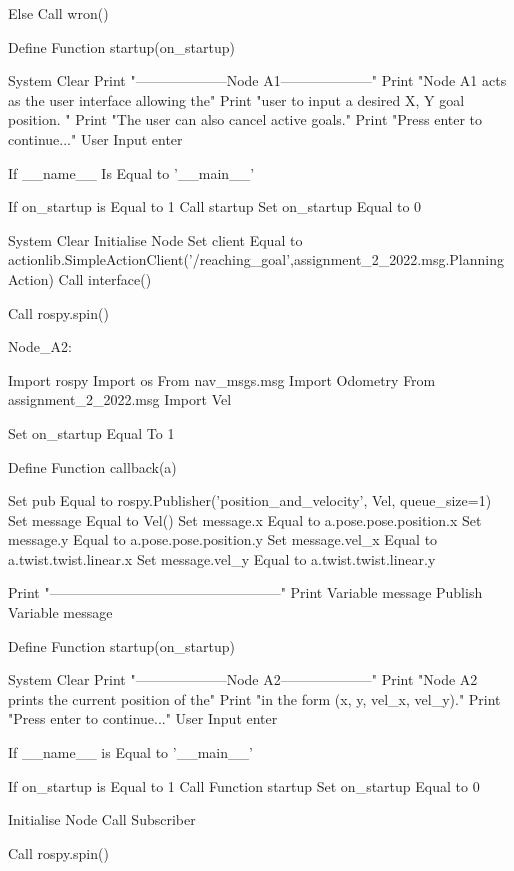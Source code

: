 \begin{DoxyVerb}
    Else
        Call wron()

Define Function startup(on_startup)

    System Clear
    Print "--------------------Node A1--------------------"
    Print "Node A1 acts as the user interface allowing the"
    Print "user to input a desired X, Y goal position. "
    Print "The user can also cancel active goals."
    Print "Press enter to continue..."
    User Input enter

If __name__ Is Equal to '__main__'

    If on_startup is Equal to 1
        Call startup
        Set on_startup Equal to 0

    System Clear
    Initialise Node
    Set client Equal to actionlib.SimpleActionClient('/reaching_goal',assignment_2_2022.msg.PlanningAction)
    Call interface()

    Call rospy.spin()
\end{DoxyVerb}


Node\+\_\+\+A2\+: \begin{DoxyVerb}Import rospy
Import os
From nav_msgs.msg Import Odometry
From assignment_2_2022.msg Import Vel

Set on_startup Equal To 1

Define Function callback(a)

    Set pub Equal to rospy.Publisher('position_and_velocity', Vel, queue_size=1)
    Set message Equal to Vel()
    Set message.x Equal to a.pose.pose.position.x
    Set message.y Equal to a.pose.pose.position.y
    Set message.vel_x Equal to a.twist.twist.linear.x
    Set message.vel_y Equal to a.twist.twist.linear.y

    Print "--------------------------------------------------"
    Print Variable message
    Publish Variable message

Define Function startup(on_startup)

    System Clear
    Print "--------------------Node A2--------------------"
    Print "Node A2 prints the current position of the"
    Print "in the form (x, y, vel_x, vel_y)."
    Print "Press enter to continue..."
    User Input enter

If __name__ is Equal to '__main__'

    If on_startup is Equal to 1
        Call Function startup
        Set on_startup Equal to 0

    Initialise Node
    Call Subscriber

    Call rospy.spin()
\end{DoxyVerb}
 